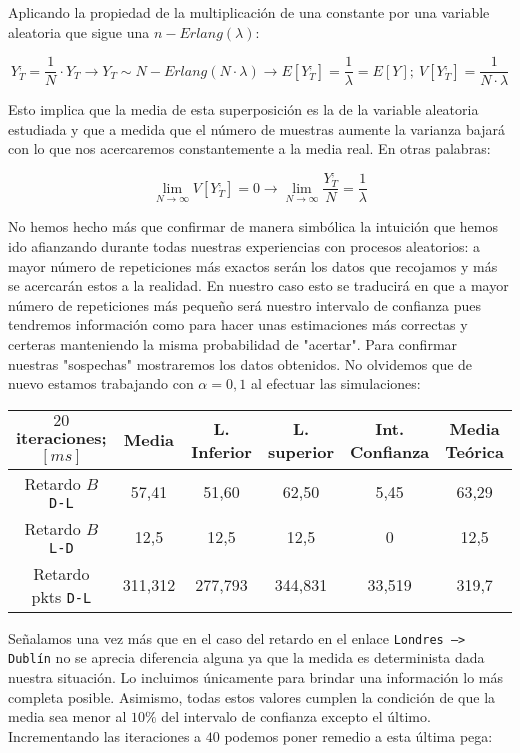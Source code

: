 \documentclass{article}[10pt]
\begin{document}
		Aplicando la propiedad de la multiplicación de una constante por una variable aleatoria que sigue una $n-Erlang(\lambda)$:

		$$Y_T^, = \frac{1}{N} \cdot Y_T \rightarrow Y_T \sim N-Erlang(N \cdot \lambda) \rightarrow E[Y_T^,] = \frac{1}{\lambda} = E[Y];\ V[Y_T^,] = \frac{1}{N \cdot \lambda}$$

		Esto implica que la media de esta superposición es la de la variable aleatoria estudiada y que a medida que el número de muestras aumente la varianza bajará con lo que nos acercaremos constantemente a la media real. En otras palabras:

		$$\lim_{N \to \infty} V[Y_T^,] = 0 \rightarrow \lim_{N \to \infty} \frac{Y_T^,}{N} = \frac{1}{\lambda}$$

		No hemos hecho más que confirmar de manera simbólica la intuición que hemos ido afianzando durante todas nuestras experiencias con procesos aleatorios: a mayor número de repeticiones más exactos serán los datos que recojamos y más se acercarán estos a la realidad. En nuestro caso esto se traducirá en que a mayor número de repeticiones más pequeño será nuestro intervalo de confianza pues tendremos información como para hacer unas estimaciones más correctas y certeras manteniendo la misma probabilidad de "acertar". Para confirmar nuestras "sospechas" mostraremos los  datos obtenidos. No olvidemos que de nuevo estamos trabajando con $\alpha = 0,1$ al efectuar las simulaciones:

		\vskip 3mm

		\begin{tabular}{| c | c | c | c | c | c |}
			\hline
			$20$ iteraciones; $[ms]$ & Media & L. Inferior & L. superior & Int. Confianza & Media Teórica\\
			\hline
			Retardo $B$ \texttt{D-L} & 57,41 & 51,60 & 62,50 & 5,45 & 63,29\\
			\hline
			Retardo $B$ \texttt{L-D} & 12,5 & 12,5 & 12,5 & 0 & 12,5\\
			\hline
			Retardo pkts \texttt{D-L} & 311,312 & 277,793 & 344,831 & 33,519 & 319,7\\
			\hline
		\end{tabular}

		\vskip 3mm

		Señalamos una vez más que en el caso del retardo en el enlace \texttt{Londres --> Dublín} no se aprecia diferencia alguna ya que la medida es determinista dada nuestra situación. Lo incluimos únicamente para brindar una información lo más completa posible. Asimismo, todas estos valores cumplen la condición de que la media sea menor al $10\%$ del intervalo de confianza excepto el último. Incrementando las iteraciones a $40$ podemos poner remedio a esta última pega:
\end{document}
